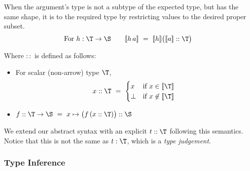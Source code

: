 When the argument's type is not a subtype of the expected type, but has the same shape,
it is  to the required type by restricting values to the desired proper subset.
%
\[\mbox{For }h:\T\to\S \qquad \semp{h\,a} ~=~ \semp{h}\big(\semp{a} :: \T\big)\]

Where $::$ is defined as follows:
\begin{itemize}
  \item For scalar (non-arrow) type $\T$, \[x :: \T ~=~ \begin{cases}x & \mbox{if }x\in\semp{\T} \\ \bot & \mbox{if }x\not\in\semp{\T}\end{cases}\]
  \item $f :: \T\to\S ~=~ x\mapsto \big(f\,(x :: \T)\big) :: \S$
\end{itemize}

\medskip
We extend our abstract syntax with an explicit 
$t::\T$ following this semantics. Notice that this is not the same as $t:\T$, which is a \emph{type judgement}.

\subsubsection{Type Inference}

